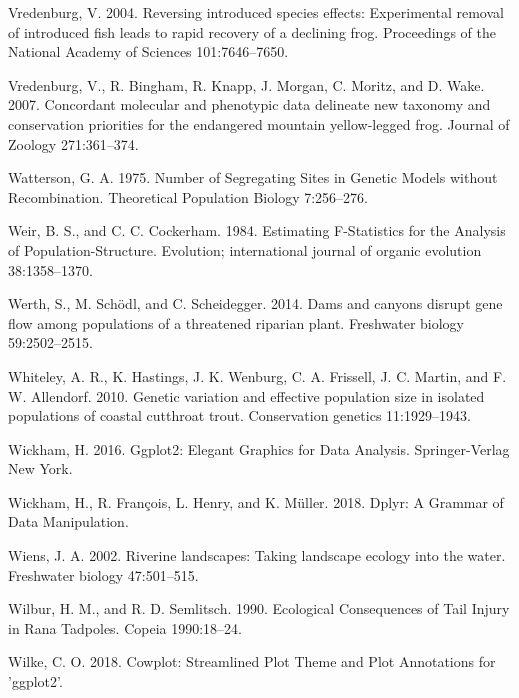 \documentclass[proquest,12pt,final]{ucthesis-CA2012} %
\begin{document}
\begin{ucmainmatter}
\leavevmode\hypertarget{ref-vredenburg_reversing_2004}{}%
Vredenburg, V. 2004. Reversing introduced species effects: Experimental
removal of introduced fish leads to rapid recovery of a declining frog.
Proceedings of the National Academy of Sciences 101:7646--7650.

\leavevmode\hypertarget{ref-vredenburg_concordant_2007}{}%
Vredenburg, V., R. Bingham, R. Knapp, J. Morgan, C. Moritz, and D. Wake.
2007. Concordant molecular and phenotypic data delineate new taxonomy
and conservation priorities for the endangered mountain yellow-legged
frog. Journal of Zoology 271:361--374.

\leavevmode\hypertarget{ref-watterson_number_1975}{}%
Watterson, G. A. 1975. Number of Segregating Sites in Genetic Models
without Recombination. Theoretical Population Biology 7:256--276.

\leavevmode\hypertarget{ref-weir_estimating_1984}{}%
Weir, B. S., and C. C. Cockerham. 1984. Estimating F-Statistics for the
Analysis of Population-Structure. Evolution; international journal of
organic evolution 38:1358--1370.

\leavevmode\hypertarget{ref-werth_dams_2014}{}%
Werth, S., M. Schödl, and C. Scheidegger. 2014. Dams and canyons disrupt
gene flow among populations of a threatened riparian plant. Freshwater
biology 59:2502--2515.

\leavevmode\hypertarget{ref-whiteley_genetic_2010}{}%
Whiteley, A. R., K. Hastings, J. K. Wenburg, C. A. Frissell, J. C.
Martin, and F. W. Allendorf. 2010. Genetic variation and effective
population size in isolated populations of coastal cutthroat trout.
Conservation genetics 11:1929--1943.

\leavevmode\hypertarget{ref-wickham_ggplot2_2016}{}%
Wickham, H. 2016. Ggplot2: Elegant Graphics for Data Analysis.
Springer-Verlag New York.

\leavevmode\hypertarget{ref-wickham_dplyr_2018}{}%
Wickham, H., R. François, L. Henry, and K. Müller. 2018. Dplyr: A
Grammar of Data Manipulation.

\leavevmode\hypertarget{ref-wiens_riverine_2002}{}%
Wiens, J. A. 2002. Riverine landscapes: Taking landscape ecology into
the water. Freshwater biology 47:501--515.

\leavevmode\hypertarget{ref-wilbur_ecological_1990}{}%
Wilbur, H. M., and R. D. Semlitsch. 1990. Ecological Consequences of
Tail Injury in Rana Tadpoles. Copeia 1990:18--24.

\leavevmode\hypertarget{ref-wilke_cowplot_2018}{}%
Wilke, C. O. 2018. Cowplot: Streamlined Plot Theme and Plot Annotations
for 'ggplot2'.


\end{ucmainmatter}
\end{document}
